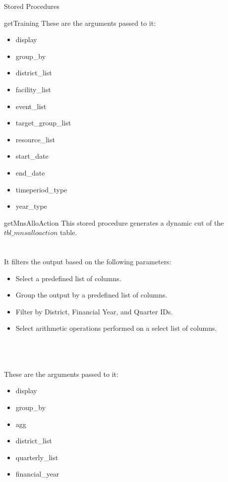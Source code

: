 \documentclass[
10pt, %
a4paper, %
oneside, %
headinclude,footinclude, %
BCOR5mm, %
]{scrartcl}
\begin{document}
\begin{section}{Stored Procedures}
\begin{subsection}{getTraining}
These are the arguments passed to it: 
\begin{itemize}
        \item display
        \item group\_by
        \item district\_list
        \item facility\_list
        \item event\_list
        \item target\_group\_list
        \item resource\_list
        \item start\_date
        \item end\_date
        \item timeperiod\_type
        \item year\_type
\end{itemize}

\end{subsection}

\newpage

\begin{subsection}{getMnsAlloAction}
This stored procedure generates a dynamic cut of the $tbl\_mnsalloaction$ table. \\ \\ \\
It filters the output based on the following parameters: 
\begin{itemize}
        \item Select a predefined list of columns.
        \item Group the output by a predefined list of columns.
        \item Filter by District, Financial Year, and Quarter IDs.
        \item Select arithmetic operations performed on a select list of columns.
\end{itemize} 
\\ \\ \\
These are the arguments passed to it: 
\begin{itemize}
        \item display
        \item group\_by
        \item agg
        \item district\_list
        \item quarterly\_list
        \item financial\_year
\end{itemize}


\end{subsection}
\end{section}
\end{document}
